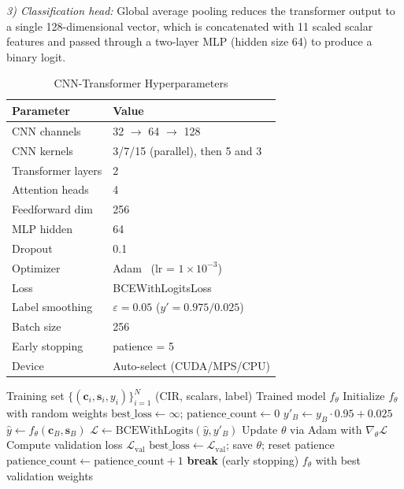 \documentclass[conference]{IEEEtran}
\begin{document}
\textit{3) Classification head:} Global average pooling reduces the transformer output to a single 128-dimensional vector, which is concatenated with 11 scaled scalar features and passed through a two-layer MLP (hidden size 64) to produce a binary logit.

\begin{table}[t]
\caption{CNN-Transformer Hyperparameters}
\label{tab:hyperparams}
\centering
\begin{tabular}{@{}ll@{}}
\toprule
\textbf{Parameter} & \textbf{Value} \\
\midrule
CNN channels & 32 $\rightarrow$ 64 $\rightarrow$ 128 \\
CNN kernels & 3/7/15 (parallel), then 5 and 3 \\
Transformer layers & 2 \\
Attention heads & 4 \\
Feedforward dim & 256 \\
MLP hidden & 64 \\
Dropout & 0.1 \\
Optimizer & Adam~\cite{b15} (lr = $1 \times 10^{-3}$) \\
Loss & BCEWithLogitsLoss \\
Label smoothing & $\varepsilon = 0.05$ ($y' = 0.975/0.025$)~\cite{b12} \\
Batch size & 256 \\
Early stopping & patience = 5 \\
Device & Auto-select (CUDA/MPS/CPU) \\
\bottomrule
\end{tabular}
\end{table}

\begin{algorithm}[t]
\caption{CNN-Transformer Training}
\label{alg:training}
\begin{algorithmic}[1]
\REQUIRE Training set $\{(\mathbf{c}_i, \mathbf{s}_i, y_i)\}_{i=1}^{N}$ (CIR, scalars, label)
\ENSURE Trained model $f_\theta$
\STATE Initialize $f_\theta$ with random weights
\STATE $\text{best\_loss} \leftarrow \infty$; $\text{patience\_count} \leftarrow 0$
        \STATE $y'_B \leftarrow y_B \cdot 0.95 + 0.025$ 
        \STATE $\hat{y} \leftarrow f_\theta(\mathbf{c}_B, \mathbf{s}_B)$
        \STATE $\mathcal{L} \leftarrow \text{BCEWithLogits}(\hat{y}, y'_B)$
        \STATE Update $\theta$ via Adam with $\nabla_\theta \mathcal{L}$
    \ENDFOR
    \STATE Compute validation loss $\mathcal{L}_\text{val}$
        \STATE $\text{best\_loss} \leftarrow \mathcal{L}_\text{val}$; save $\theta$; reset patience
    \ELSE
        \STATE $\text{patience\_count} \leftarrow \text{patience\_count} + 1$
    \ENDIF
        \STATE \textbf{break} (early stopping)
    \ENDIF
\ENDFOR
\RETURN $f_\theta$ with best validation weights
\end{algorithmic}
\end{algorithm}
\end{document}
